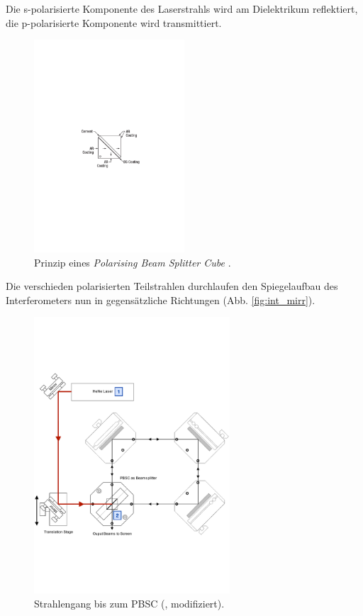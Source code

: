 Die s-polarisierte Komponente des Laserstrahls wird am Dielektrikum reflektiert, die p-polarisierte Komponente wird transmittiert.
\begin{figure}[h!]
  \centering
  \includegraphics[width=0.5\textwidth]{content/images/pbsc.pdf}
  \caption{Prinzip eines \textit{Polarising Beam Splitter Cube} \cite{thorlabs}.}
  \label{fig:pbsc}
\end{figure}
Die verschieden polarisierten Teilstrahlen durchlaufen den Spiegelaufbau des Interferometers nun in gegensätzliche Richtungen (Abb. \ref{fig:int_mirr}).
\begin{figure}[h!]
  \centering
  \includegraphics[width=0.65\textwidth]{content/images/interferometer_1.pdf}
  \caption{Strahlengang bis zum PBSC (\cite{teachspin}, modifiziert).}
  \label{fig:int_pbsc}
\end{figure}
